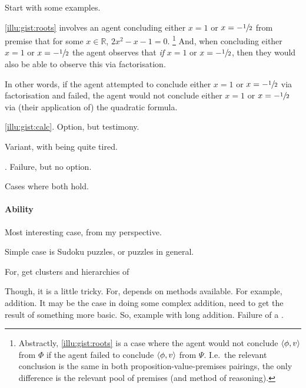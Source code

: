 \begin{note}
  Start with some examples.
\end{note}

\begin{note}[Example]
  \autoref{illu:gist:roots} involves an agent concluding either \(x = 1\) or \(x = -\sfrac{1}{2}\) from premise that for some \(x \in \mathbb{R}\), \(2x^{2} - x - 1 = 0\).%
  \footnote{
    Abstractly, \autoref{illu:gist:roots} is a case where the agent would not conclude \(\langle \phi, v \rangle\) from \(\Phi\) if the agent failed to conclude \(\langle \phi, v \rangle\) from \(\Psi\).
    I.e.\ the relevant conclusion is the same in both proposition-value-premises pairings, the only difference is the relevant pool of premises (and method of reasoning).
  }
  And, when concluding either \(x = 1\) or \(x = -\sfrac{1}{2}\) the agent observes that \emph{if} \(x = 1\) or \(x = -\sfrac{1}{2}\), then they would also be able to observe this via factorisation.

  In other words, if the agent attempted to conclude either \(x = 1\) or \(x = -\sfrac{1}{2}\) via factorisation and failed, the agent would not conclude either \(x = 1\) or \(x = -\sfrac{1}{2}\) via (their application of) the quadratic formula.
\end{note}

\begin{note}
  \autoref{illu:gist:calc}.
  Option, but testimony.
\end{note}

\begin{note}
  Variant, with being quite tired.
\end{note}

\begin{note}
  \citeauthor{Dretske:1970to}.
  Failure, but no option.
\end{note}

\begin{note}
  Cases where both hold.
\end{note}

\paragraph{Ability}

\begin{note}
  Most interesting case, from my perspective.

  Simple case is Sudoku puzzles, or puzzles in general.

  For, get clusters and hierarchies of 

  Though, it is a little tricky.
  For, depends on methods available.
  For example, addition.
  It may be the case in doing some complex addition, need to get the result of something more basic.
  So, example with long addition.
  Failure of a \requ{}.
\end{note}

